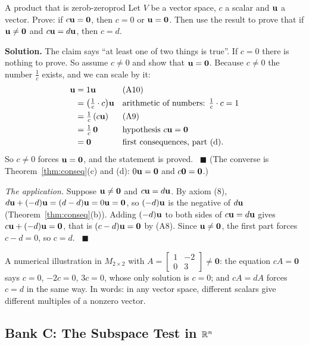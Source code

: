 \documentclass[11pt]{article}
\begin{document}
\begin{exmp}{A product that is zero}{b-zeroprod}
Let $V$ be a vector space, $c$ a scalar and $\mathbf{u}$ a vector. Prove: if $c\mathbf{u}=\mathbf{0}$, then $c=0$ or $\mathbf{u}=\mathbf{0}$. Then use the result to prove that if $\mathbf{u}\neq\mathbf{0}$ and $c\mathbf{u}=d\mathbf{u}$, then $c=d$.

\textbf{Solution.} The claim says ``at least one of two things is true''. If $c=0$ there is nothing to prove. So assume $c\neq0$ and show that $\mathbf{u}=\mathbf{0}$. Because $c\neq0$ the number $\tfrac1c$ exists, and we can scale by it:
\begin{align*}
\mathbf{u}&=1\mathbf{u} &&\text{(A10)}\\
&=\bigl(\tfrac1c\cdot c\bigr)\mathbf{u} &&\text{arithmetic of numbers: } \tfrac1c\cdot c=1\\
&=\tfrac1c\,(c\mathbf{u}) &&\text{(A9)}\\
&=\tfrac1c\,\mathbf{0} &&\text{hypothesis } c\mathbf{u}=\mathbf{0}\\
&=\mathbf{0} &&\text{first consequences, part (d)}.
\end{align*}
So $c\neq0$ forces $\mathbf{u}=\mathbf{0}$, and the statement is proved. \ $\blacksquare$ (The converse is Theorem~\ref{thm:conseq}(c) and (d): $0\mathbf{u}=\mathbf{0}$ and $c\mathbf{0}=\mathbf{0}$.)

\emph{The application.} Suppose $\mathbf{u}\neq\mathbf{0}$ and $c\mathbf{u}=d\mathbf{u}$. By axiom (8), $d\mathbf{u}+(-d)\mathbf{u}=(d-d)\mathbf{u}=0\mathbf{u}=\mathbf{0}$, so $(-d)\mathbf{u}$ is the negative of $d\mathbf{u}$ (Theorem~\ref{thm:conseq}(b)). Adding $(-d)\mathbf{u}$ to both sides of $c\mathbf{u}=d\mathbf{u}$ gives $c\mathbf{u}+(-d)\mathbf{u}=\mathbf{0}$, that is $(c-d)\mathbf{u}=\mathbf{0}$ by (A8). Since $\mathbf{u}\neq\mathbf{0}$, the first part forces $c-d=0$, so $c=d$. \ $\blacksquare$

A numerical illustration in $M_{2\times2}$ with $A=\begin{bmatrix}1&-2\\0&3\end{bmatrix}\neq\mathbf{0}$: the equation $cA=\mathbf{0}$ says $c=0$, $-2c=0$, $3c=0$, whose only solution is $c=0$; and $cA=dA$ forces $c=d$ in the same way. In words: in any vector space, different scalars give different multiples of a nonzero vector.
\end{exmp}

\subsection*{Bank C: The Subspace Test in $\mathbb{R}^n$}
\end{document}
